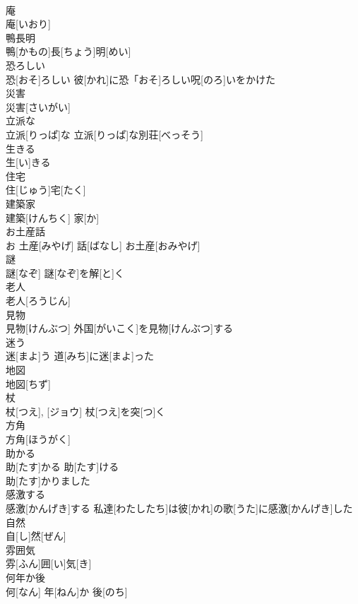 \documentclass[8pt]{extreport}
\begin{document}
\begin{CJK}{UTF8}{min}
\\	庵	
\\	庵[いおり]	
\\	鴨長明	
\\	鴨[かもの]長[ちょう]明[めい]	
\\	恐ろしい	
\\	恐[おそ]ろしい	彼[かれ]に恐「おそ]ろしい呪[のろ]いをかけた 
\\	災害	
\\	災害[さいがい]	
\\	立派な	
\\	立派[りっぱ]な	立派[りっぱ]な別荘[べっそう] 
\\	生きる	
\\	生[い]きる	
\\	住宅	
\\	住[じゅう]宅[たく]	
\\	建築家	
\\	建築[けんちく] 家[か]	
\\	お土産話	
\\	お 土産[みやげ] 話[ばなし]	お土産[おみやげ] 
\\	謎	
\\	謎[なぞ]	謎[なぞ]を解[と]く 
\\	老人	
\\	老人[ろうじん]	
\\	見物	
\\	見物[けんぶつ]	外国[がいこく]を見物[けんぶつ]する 
\\	迷う	
\\	迷[まよ]う	道[みち]に迷[まよ]った 
\\	地図	
\\	地図[ちず]	
\\	杖	
\\	杖[つえ], [ジョウ]	杖[つえ]を突[つ]く 
\\	方角	
\\	方角[ほうがく]	
\\	助かる	
\\	助[たす]かる	助[たす]ける 
\\	助[たす]かりました 
\\	感激する	
\\	感激[かんげき]する	私達[わたしたち]は彼[かれ]の歌[うた]に感激[かんげき]した 
\\	自然	
\\	自[し]然[ぜん]	
\\	雰囲気	
\\	雰[ふん]囲[い]気[き]	
\\	何年か後	
\\	何[なん] 年[ねん]か 後[のち]	

\end{CJK}
\end{document}
